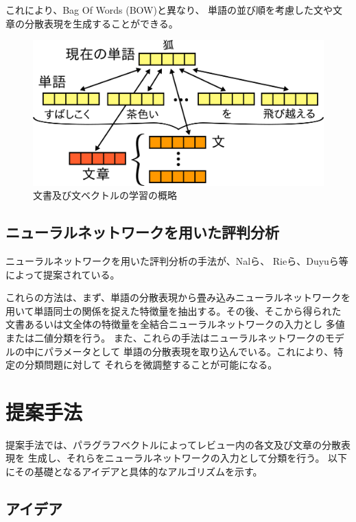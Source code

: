 \documentclass{ttithesis}
\begin{document}
これにより、Bag Of Words (BOW)と異なり、
単語の並び順を考慮した文や文章の分散表現を生成することができる。

\begin{figure}
  \includegraphics{fig/dvsvwv.png}
  \caption{文書及び文ベクトルの学習の概略}
  \label{fig:ParagraphVector}
\end{figure}


\subsection{ニューラルネットワークを用いた評判分析}

 ニューラルネットワークを用いた評判分析の手法が、Nalら\cite{nal14}、
Rieら\cite{rie14}、Duyuら\cite{duyu15}等によって提案されている。

 これらの方法は、まず、単語の分散表現から畳み込みニューラルネットワークを
用いて単語同士の関係を捉えた特徴量を抽出する。その後、そこから得られた
文書あるいは文全体の特徴量を全結合ニューラルネットワークの入力とし
多値または二値分類を行う。
また、これらの手法はニューラルネットワークのモデルの中にパラメータとして
単語の分散表現を取り込んでいる。これにより、特定の分類問題に対して
それらを微調整することが可能になる。



\section{提案手法}

提案手法では、パラグラフベクトルによってレビュー内の各文及び文章の分散表現を
生成し、それらをニューラルネットワークの入力として分類を行う。
以下にその基礎となるアイデアと具体的なアルゴリズムを示す。


\subsection{アイデア}
\end{document}
